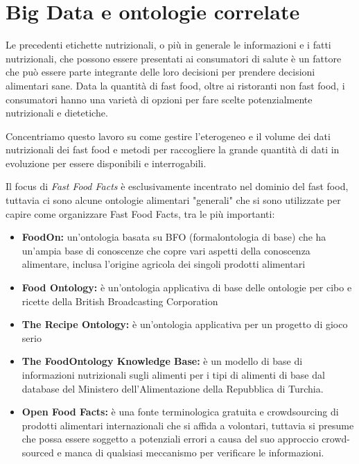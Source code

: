 \section{Big Data e ontologie correlate}

Le precedenti etichette nutrizionali, o più in generale le informazioni e i fatti nutrizionali, che possono essere presentati ai consumatori di salute è un fattore che può essere parte integrante delle loro decisioni per prendere decisioni alimentari sane. 
Data la quantità di fast food, oltre ai ristoranti non fast food, i consumatori hanno una varietà di opzioni per fare scelte potenzialmente nutrizionali e dietetiche. 

Concentriamo questo lavoro su come gestire l'eterogeneo e il volume dei dati nutrizionali dei fast food e metodi per raccogliere la grande quantità di dati in evoluzione per essere disponibili e interrogabili. 

Il focus di \emph{Fast Food Facts} è esclusivamente incentrato nel dominio del fast food, tuttavia ci sono alcune ontologie alimentari "generali" che si sono utilizzate per capire come organizzare Fast Food Facts, tra le più importanti:
\begin{itemize}
    \item \textbf{FoodOn:} un'ontologia basata su BFO (formalontologia di base) che ha un'ampia base di conoscenze che copre vari aspetti della conoscenza alimentare, inclusa l'origine agricola dei singoli prodotti alimentari
    \item \textbf{Food Ontology:} è un'ontologia applicativa di base delle ontologie per cibo e ricette della British Broadcasting Corporation
    \item \textbf{The Recipe Ontology:} è un'ontologia applicativa per un progetto di gioco serio
    \item \textbf{The FoodOntology Knowledge Base:} è un modello di base di informazioni nutrizionali sugli alimenti per i tipi di alimenti di base dal database del Ministero dell'Alimentazione della Repubblica di Turchia.
    \item \textbf{Open Food Facts:} è una fonte terminologica gratuita e crowdsourcing di prodotti alimentari internazionali che si affida a volontari, tuttavia si presume che possa essere soggetto a potenziali errori a causa del suo approccio crowd-sourced e manca di qualsiasi meccanismo per verificare le informazioni.
\end{itemize}

